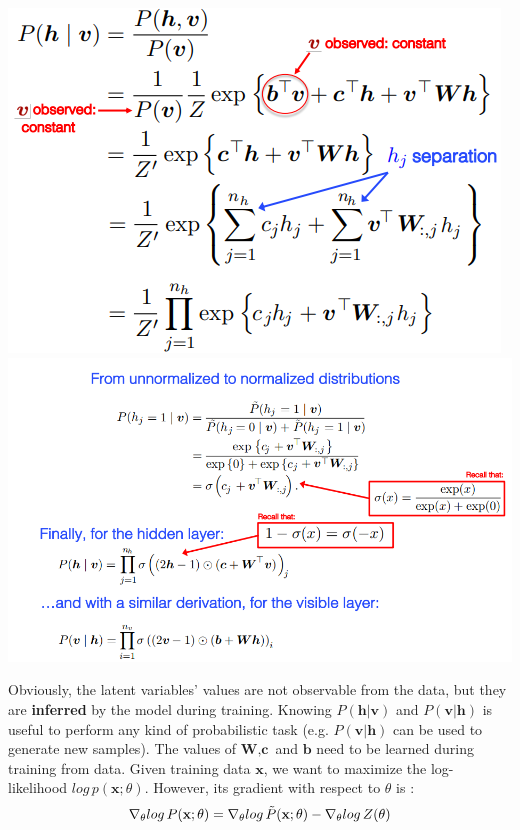 \begin{center}
    \includegraphics[]{images/pvh.png}
    \includegraphics[scale=0.7]{images/pvh2.png}
\end{center}
Obviously, the latent variables' values are not observable from the data, but they are \textbf{inferred} by the model during training. Knowing $P(\textbf{h}|\textbf{v})$ and $P(\textbf{v}|\textbf{h})$ is useful to perform any kind of probabilistic task (e.g. $P(\textbf{v}|\textbf{h})$ can be used to generate new samples). The values of $\textbf{W}, \textbf{c}$ and $\textbf{b}$ need to be learned during training from data.
\newline\newline
Given training data $\textbf{x}$, we want to maximize the log-likelihood $log\,p(\textbf{x};\theta)$. However, its gradient with respect to $\theta$ is :
\[\nabla_\theta log\,P(\textbf{x};\theta) = \nabla_\theta log\,\Tilde{P}(\textbf{x};\theta) - \nabla_\theta log\, Z(\theta)\]
